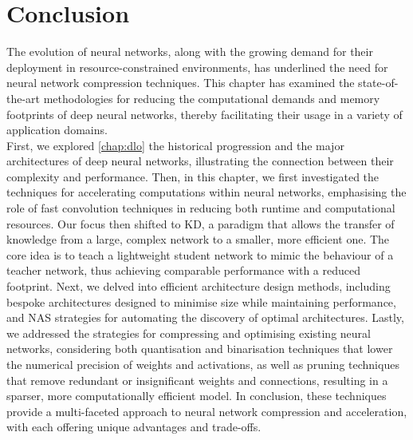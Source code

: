 
\section{Conclusion}


The evolution of neural networks, along with the growing demand for their
deployment in resource-constrained environments, has underlined the need for
neural network compression techniques. This chapter has examined the
state-of-the-art methodologies for reducing the computational demands and memory
footprints of deep neural networks, thereby facilitating their usage in a
variety of application domains.\\

First, we explored \cref{chap:dlo} the historical progression and the major
architectures of deep neural networks, illustrating the connection between their
complexity and performance. Then, in this chapter, we first investigated the
techniques for accelerating computations within neural networks, emphasising the
role of fast convolution techniques in reducing both runtime and computational
resources. Our focus then shifted to \acl{KD}, a paradigm that allows the
transfer of knowledge from a large, complex network to a smaller, more efficient
one. The core idea is to teach a lightweight student network to mimic the
behaviour of a teacher network, thus achieving comparable performance with a
reduced footprint. Next, we delved into efficient architecture design methods,
including bespoke architectures designed to minimise size while maintaining
performance, and \acl{NAS} strategies for automating the discovery of optimal
architectures. Lastly, we addressed the strategies for compressing and
optimising existing neural networks, considering both quantisation and
binarisation techniques that lower the numerical precision of weights and
activations, as well as pruning techniques that remove redundant or
insignificant weights and connections, resulting in a sparser, more
computationally efficient model. In conclusion, these techniques provide a
multi-faceted approach to neural network compression and acceleration, with each
offering unique advantages and trade-offs.\\

